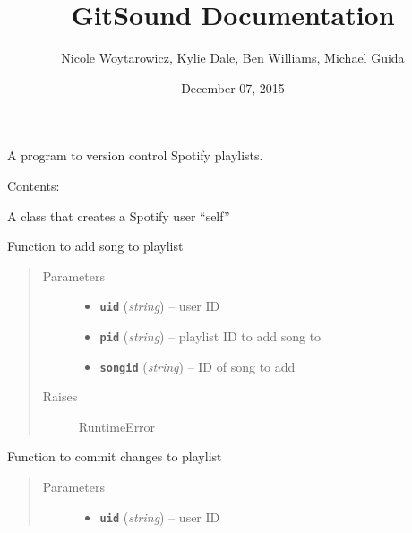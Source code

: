 \documentclass[letterpaper,10pt,english]{sphinxmanual}
\title{GitSound Documentation}
\date{December 07, 2015}
\author{Nicole Woytarowicz, Kylie Dale, Ben Williams, Michael Guida}
\begin{document}
\maketitle
\tableofcontents
{}\label{index::doc}


A program to version control Spotify playlists.

Contents:
\label{index:module-gitsound}

\begin{fulllineitems}
\label{index:gitsound.SpotifyUser}
A class that creates a Spotify user ``self''

\begin{fulllineitems}
\label{index:gitsound.SpotifyUser.add_song_to_playlist}
Function to add song to playlist
\begin{quote}\begin{description}
\item[{Parameters}] \leavevmode\begin{itemize}
\item {} 
\textbf{\texttt{uid}} (\emph{string}) -- user ID

\item {} 
\textbf{\texttt{pid}} (\emph{string}) -- playlist ID to add song to

\item {} 
\textbf{\texttt{songid}} (\emph{string}) -- ID of song to add

\end{itemize}

\item[{Raises}] \leavevmode
RuntimeError

\end{description}\end{quote}

\end{fulllineitems}


\begin{fulllineitems}
\label{index:gitsound.SpotifyUser.commit_changes_to_playlist}
Function to commit changes to playlist
\begin{quote}\begin{description}
\item[{Parameters}] \leavevmode\begin{itemize}
\item {} 
\textbf{\texttt{uid}} (\emph{string}) -- user ID


\end{itemize}
\end{description}
\end{quote}
\end{fulllineitems}
\end{fulllineitems}
\end{document}
